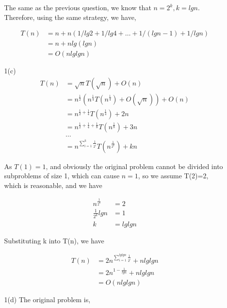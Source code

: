 \documentclass[12pt,letterpaper]{article}
\begin{document}
\begin{itemize}
\begin{itemize}
                The same as the previous question, we know that $n=2^k, k=lgn$. Therefore, using the same strategy, we have,
                
                $$\begin{aligned}
                T(n) &= n+n(1/lg2+1/lg4+\dots+1/(lgn-1)+1/lgn)\\
                &= n+nlg(lgn)\\
                &= O(nlglgn)
                \end{aligned}$$
            \item[1(c)] 
            $$\begin{aligned}
                T(n) &= \sqrt{n}T(\sqrt{n})+O(n)\\
                &=n^{\frac{1}{2}}(n^{\frac{1}{4}}T(n^{\frac{1}{4}})+O(\sqrt{n}))+O(n)\\
                &=n^{\frac{1}{2}+\frac{1}{4}}T(n^{\frac{1}{4}})+2n\\
                &=n^{\frac{1}{2}+\frac{1}{4}+\frac{1}{8}}T(n^{\frac{1}{8}})+3n\\
                &\dots\\
                &=n^{\sum_{i=1}^k\frac{1}{2^i}}T(n^{\frac{1}{2^k}})+kn
                \end{aligned}$$
                
                As $T(1)=1$, and obviously the original problem cannot be divided into subproblems of size 1, which can cause $n=1$, so we assume T(2)=2, which is reasonable, and we have
                
                $$\begin{aligned}
                n^{\frac{1}{2^k}}&=2\\
                \frac{1}{2^k}lgn&=1\\
                k&=lglgn
                \end{aligned}$$
                
                Substituting k into T(n), we have
                
                $$\begin{aligned}
                T(n)&=2n^{\sum_{i=1}^{lglgn}\frac{1}{2^i}}+nlglgn\\
                &=2n^{1-\frac{1}{lgn}}+nlglgn\\
                &=O(nlglgn)
            \end{aligned}$$
            \item[1(d)]
            The original problem is,


\end{itemize}
\end{itemize}
\end{document}
